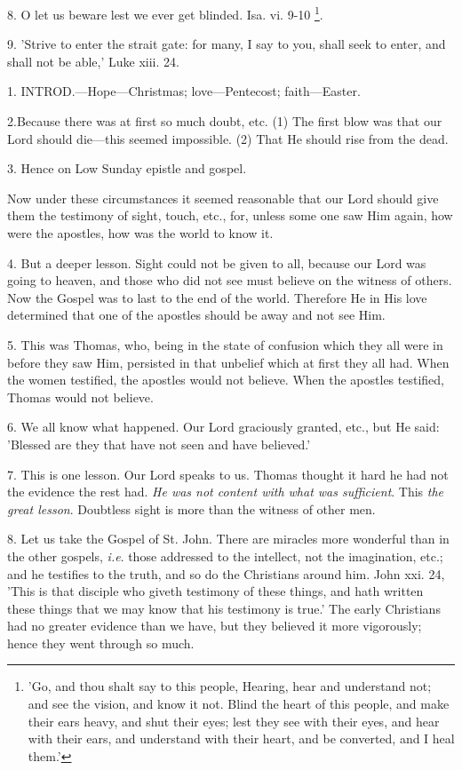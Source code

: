 8. O let us beware lest we ever get blinded. Isa.
vi. 9-10 \footnote{'Go, and thou shalt say
to this people, Hearing, hear and understand not; and see the vision,
and know it not. Blind the heart of this people, and make their ears
heavy, and shut their eyes; lest they see with their eyes, and hear
with their ears, and understand with their heart, and be converted,
and I heal them.'}.

9. 'Strive to enter the strait gate: for many, I
say to you, shall seek to enter, and shall not be able,' Luke xiii.
24.


1. INTROD.—Hope—Christmas;
love—Pentecost; faith—Easter.

2.Because there was at first so much doubt, etc.
(1) The first blow was that our Lord should die—this seemed
impossible. (2) That He should rise from the dead.

3. Hence on Low Sunday epistle and gospel.

Now under these circumstances it seemed
reasonable that our Lord should give them the testimony of
sight, touch, etc., for, unless some one saw Him again, how were the
apostles, how was the world to know it.

4. But a deeper lesson. Sight could not be given
to all, because our Lord was going to heaven, and those who did not
see must believe on the witness of others. Now the Gospel was to last
to the end of the world. Therefore He in His love determined that one
of the apostles should be away and not see Him.

5. This was Thomas, who, being in the state of
confusion which they all were in before they saw Him, persisted in
that unbelief which at first they all had. When the women testified,
the apostles would not believe. When the apostles testified, Thomas
would not believe.

6. We all know what happened. Our Lord graciously
granted, etc., but He said: 'Blessed are they that have not seen and
have believed.'

7. This is one lesson. Our Lord speaks to us.
Thomas thought it hard he had not the evidence the rest had. \emph{He was
not content with what was sufficient}. This \emph{the great lesson}.
Doubtless sight is more than the witness of other men.

8. Let us take the Gospel of St. John. There are
miracles more wonderful than in the other gospels, \emph{i.e}. those
addressed to the intellect, not the imagination, etc.; and he
testifies to the truth, and so do the Christians around him. John xxi.
24, 'This is that disciple who giveth testimony of these things, and
hath written these things that we may know that his testimony is
true.' The early Christians had no greater evidence than we have,
but they believed it more vigorously; hence they went through so
much.

